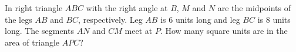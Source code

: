 In right triangle $ABC$ with the right angle at $B$, $M$ and $N$ are the midpoints of the legs $AB$ and $BC$, respectively. Leg $AB$ is $6$ units long and leg $BC$ is $8$ units long. The segments $AN$ and $CM$ meet at $P$. How many square units are in the area of triangle $APC$?
